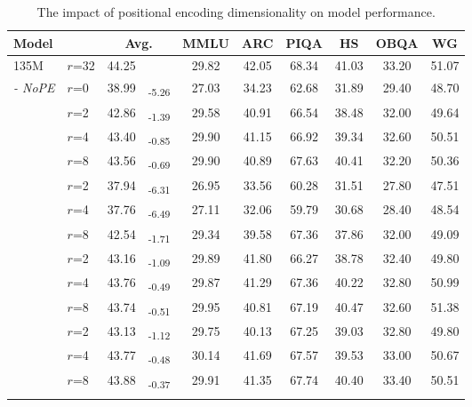 \begin{table*}[t]
\centering
\small
\begin{tabular}{l@{}lr@{\hspace{2pt}}lcccccc}
  \toprule
  \multicolumn{2}{l}{\textbf{Model}}  & \multicolumn{2}{c}{\textbf{Avg.}} & \textbf{MMLU} & \textbf{ARC} & \textbf{PIQA} & \textbf{HS} & \textbf{OBQA} & \textbf{WG}\\
  \midrule
  \rowcolor{gray!10}135M & $r$=32 & \multicolumn{2}{l}{44.25}  & 29.82 & 42.05 & 68.34 & 41.03 & 33.20 & 51.07 \\
  \arrayrulecolor{gray!20}
  \hline
  \textit{- NoPE} & $r$=0 & 38.99 &\textsubscript{-5.26} & 27.03 & 34.23 & 62.68 & 31.89 & 29.40 & 48.70 \\
  \arrayrulecolor{gray!20}
  \hline
  \multirow{3}{*}{- $\mathcal{S}_{\text{high}}$} 
  & $r$=2 & 42.86 &\textsubscript{-1.39}& 29.58 & 40.91 & 66.54 & 38.48 & 32.00 & 49.64 \\
  & $r$=4 & 43.40 &\textsubscript{-0.85}& 29.90 & 41.15 & 66.92 & 39.34 & 32.60 & 50.51 \\
  & $r$=8 & 43.56 &\textsubscript{-0.69}& 29.90 & 40.89 & 67.63 & 40.41 & 32.20 & 50.36 \\
  \arrayrulecolor{gray!20}
  \hline
  \multirow{3}{*}{- $\mathcal{S}_{\text{low}}$} 
  & $r$=2 & 37.94 &\textsubscript{-6.31}& 26.95 & 33.56 & 60.28 & 31.51 & 27.80 & 47.51 \\
  & $r$=4 & 37.76 &\textsubscript{-6.49}& 27.11 & 32.06 & 59.79 & 30.68 & 28.40 & 48.54 \\
  & $r$=8 & 42.54 &\textsubscript{-1.71}& 29.34 & 39.58 & 67.36 & 37.86 & 32.00 & 49.09 \\
  \arrayrulecolor{gray!20}
  \hline
  \multirow{3}{*}{- $\mathcal{S}_{\text{uniform}}$} 
  & $r$=2 & 43.16 &\textsubscript{-1.09}& 29.89 & 41.80 & 66.27 & 38.78 & 32.40 & 49.80 \\
  & $r$=4 & 43.76 &\textsubscript{-0.49}& 29.87 & 41.29 & 67.36 & 40.22 & 32.80 & 50.99 \\
  & $r$=8 & 43.74 &\textsubscript{-0.51}& 29.95 & 40.81 & 67.19 & 40.47 & 32.60 & 51.38 \\
  \arrayrulecolor{gray!20}
  \hline
  \multirow{3}{*}{- $\mathcal{S}_{\text{2-norm}}$} 
  & $r$=2 & 43.13 &\textsubscript{-1.12}& 29.75 & 40.13 & 67.25 & 39.03 & 32.80 & 49.80 \\
  & $r$=4 & 43.77 &\textsubscript{-0.48}& 30.14 & 41.69 & 67.57 & 39.53 & 33.00 & 50.67 \\
  & $r$=8 & 43.88 &\textsubscript{-0.37}& 29.91 & 41.35 & 67.74 & 40.40 & 33.40 & 50.51 \\
  \arrayrulecolor{black}
  \bottomrule
\end{tabular}
\caption{The impact of positional encoding dimensionality on model performance.}
\label{tab:pe_dim}
\end{table*} 
